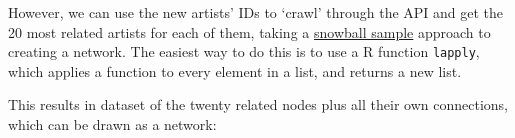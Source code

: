 \documentclass[
]{book}
\newenvironment{Shaded}{\begin{snugshade}}{\end{snugshade}}
\newcommand{\AttributeTok}[1]{\textcolor[rgb]{0.77,0.63,0.00}{#1}}
\newcommand{\DecValTok}[1]{\textcolor[rgb]{0.00,0.00,0.81}{#1}}
\newcommand{\FunctionTok}[1]{\textcolor[rgb]{0.00,0.00,0.00}{#1}}
\newcommand{\NormalTok}[1]{#1}
\newcommand{\OtherTok}[1]{\textcolor[rgb]{0.56,0.35,0.01}{#1}}
\newcommand{\SpecialCharTok}[1]{\textcolor[rgb]{0.00,0.00,0.00}{#1}}
\begin{document}
However, we can use the new artists' IDs to `crawl' through the API and get the 20 most related artists for each of them, taking a \href{https://en.wikipedia.org/wiki/Snowball_sampling}{snowball sample} approach to creating a network. The easiest way to do this is to use a R function \texttt{lapply}, which applies a function to every element in a list, and returns a new list.

\begin{Shaded}
\end{Shaded}

This results in dataset of the twenty related nodes plus all their own connections, which can be drawn as a network:
\end{document}
